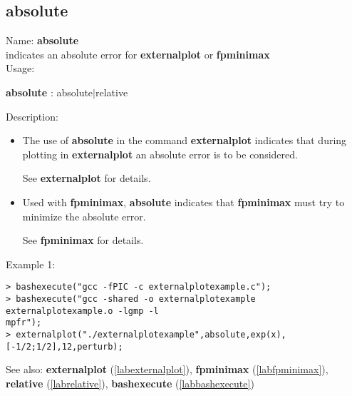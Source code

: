 \subsection{absolute}
\label{lababsolute}
\noindent Name: \textbf{absolute}\\
indicates an absolute error for \textbf{externalplot} or \textbf{fpminimax}\\
\noindent Usage: 
\begin{center}
\textbf{absolute} : \textsf{absolute$|$relative}
\\ 
\end{center}
\noindent Description: \begin{itemize}

\item The use of \textbf{absolute} in the command \textbf{externalplot} indicates that during
   plotting in \textbf{externalplot} an absolute error is to be considered.
    
   See \textbf{externalplot} for details.

\item Used with \textbf{fpminimax}, \textbf{absolute} indicates that \textbf{fpminimax} must try to minimize
   the absolute error.
    
   See \textbf{fpminimax} for details.
\end{itemize}
\noindent Example 1: 
\begin{center}\begin{minipage}{15cm}\begin{Verbatim}[frame=single]
> bashexecute("gcc -fPIC -c externalplotexample.c");
> bashexecute("gcc -shared -o externalplotexample externalplotexample.o -lgmp -l
mpfr");
> externalplot("./externalplotexample",absolute,exp(x),[-1/2;1/2],12,perturb);
\end{Verbatim}
\end{minipage}\end{center}
See also: \textbf{externalplot} (\ref{labexternalplot}), \textbf{fpminimax} (\ref{labfpminimax}), \textbf{relative} (\ref{labrelative}), \textbf{bashexecute} (\ref{labbashexecute})

